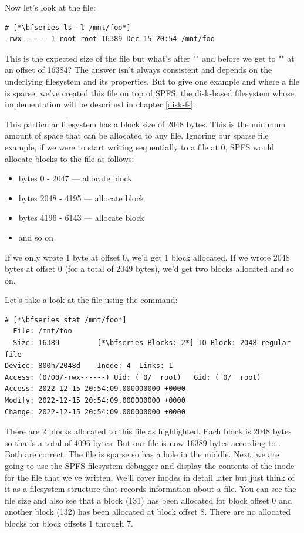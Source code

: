 \noindent
Now let's look at the file:

\begin{lstlisting}
# [*\bfseries ls -l /mnt/foo*]
-rwx------ 1 root root 16389 Dec 15 20:54 /mnt/foo
\end{lstlisting}

\noindent
This is the expected size of the file but what's after "" and before we get to "" at an offset of 16384? The answer isn't always consistent and depends on the underlying filesystem and its properties. But to give one example and where a file is sparse, we've created this file on top of SPFS, the disk-based filesystem whose implementation will be described in chapter \ref{disk-fs}.

This particular filesystem has a block size of 2048 bytes. This is the minimum amount of space that can be allocated to any file. Ignoring our sparse file example, if we were to start writing sequentially to a file at 0, SPFS would allocate blocks to the file as follows:

\begin{itemize}
	\item bytes 0 - 2047 --- allocate block
	\item bytes 2048 - 4195 --- allocate block
	\item bytes 4196 - 6143 --- allocate block
	\item and so on
\end{itemize}

\noindent
If we only wrote 1 byte at offset 0, we'd get 1 block allocated. If we wrote 2048 bytes at offset 0 (for a total of 2049 bytes), we'd get two blocks allocated and so on.

Let's take a look at the file using the  command:

\begin{lstlisting}
# [*\bfseries stat /mnt/foo*]
  File: /mnt/foo
  Size: 16389     	  [*\bfseries Blocks: 2*] IO Block: 2048 regular file
Device: 800h/2048d	  Inode: 4  Links: 1
Access: (0700/-rwx------) Uid: ( 0/  root)   Gid: ( 0/  root)
Access: 2022-12-15 20:54:09.000000000 +0000
Modify: 2022-12-15 20:54:09.000000000 +0000
Change: 2022-12-15 20:54:09.000000000 +0000
\end{lstlisting}

\noindent
There are 2 blocks allocated to this file as highlighted. Each block is 2048 bytes so that's a total of 4096 bytes. But our file is now 16389 bytes according to . Both are correct. The file is sparse so has a hole in the middle. Next, we are going to use the SPFS filesystem debugger and display the contents of the inode for the file that we've written. We'll cover inodes in detail later but just think of it as a filesystem structure that records information about a file. You can see the file size and also see that a block (131) has been allocated for block offset 0 and another block (132) has been allocated at block offset 8. There are no allocated blocks for block offsets 1 through 7.

